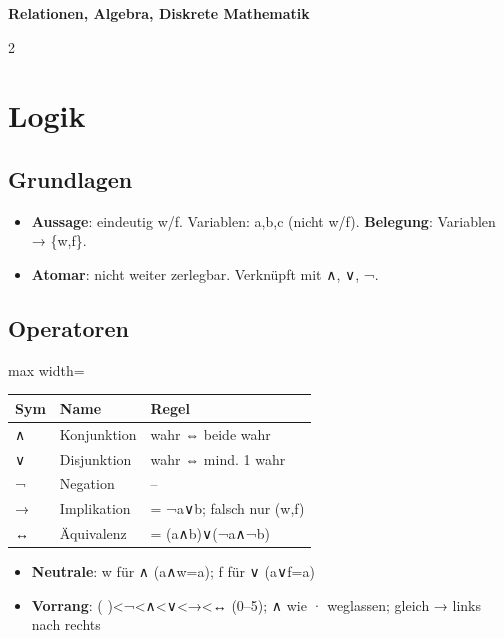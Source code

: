 \documentclass[10pt, a4paper]{article}
\providecommand{\nichttitle}{Formelsammlung}
\renewcommand{\nichttitle}{Relationen, Algebra, Diskrete Mathematik}
\begin{document}
\begin{center}
{\small\bfseries\color{accent}\nichttitle}
\end{center}
\vspace{-6pt}

\scriptsize
\begin{multicols}{2}


\section{Logik}


\subsection{Grundlagen}
\begin{itemize}
  \item \textbf{Aussage}: eindeutig w/f. Variablen: a,b,c (nicht w/f). \textbf{Belegung}: Variablen → \{w,f\}.
  \item \textbf{Atomar}: nicht weiter zerlegbar. Verknüpft mit ∧, ∨, ¬.
\end{itemize}


\subsection{Operatoren}

{\small
\begin{adjustbox}{max width=\linewidth}
{\scriptsize
\begin{tabular}{lll}
\toprule
\textbf{Sym} & \textbf{Name} & \textbf{Regel} \\
\midrule
∧ & Konjunktion & wahr ⇔ beide wahr \\
∨ & Disjunktion & wahr ⇔ mind. 1 wahr \\
¬ & Negation & – \\
→ & Implikation & = ¬a∨b; falsch nur (w,f) \\
↔ & Äquivalenz & = (a∧b)∨(¬a∧¬b) \\
\bottomrule
\end{tabular}
}
\end{adjustbox}
}


\begin{itemize}
  \item \textbf{Neutrale}: w für ∧ (a∧w=a); f für ∨ (a∨f=a)
  \item \textbf{Vorrang}: ( )<¬<∧<∨<→<↔ (0–5); ∧ wie · weglassen; gleich → links nach rechts
\end{itemize}



\end{multicols}
\end{document}
